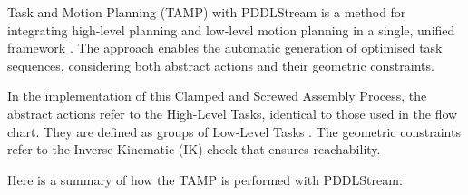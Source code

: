 Task and Motion Planning (TAMP) with PDDLStream is a method for integrating high-level planning and low-level motion planning in a single, unified framework . The approach enables the automatic generation of optimised task sequences, considering both abstract actions and their geometric constraints. 

In the implementation of this Clamped and Screwed Assembly Process, the abstract actions refer to the High-Level Tasks, identical to those used in the flow chart. They are defined as groups of Low-Level Tasks . The geometric constraints refer to the Inverse Kinematic (IK) check that ensures reachability. 

Here is a summary of how the TAMP is performed with PDDLStream:

